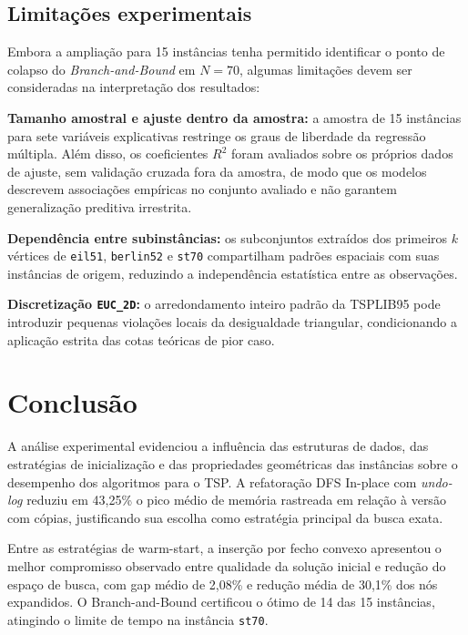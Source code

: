 \subsection{Limitações experimentais}

Embora a ampliação para 15 instâncias tenha permitido identificar o ponto de colapso do \textit{Branch-and-Bound} em $N=70$, algumas limitações devem ser consideradas na interpretação dos resultados:

\textbf{Tamanho amostral e ajuste dentro da amostra:} a amostra de 15 instâncias para sete variáveis explicativas restringe os graus de liberdade da regressão múltipla. Além disso, os coeficientes $R^2$ foram avaliados sobre os próprios dados de ajuste, sem validação cruzada fora da amostra, de modo que os modelos descrevem associações empíricas no conjunto avaliado e não garantem generalização preditiva irrestrita.

\textbf{Dependência entre subinstâncias:} os subconjuntos extraídos dos primeiros $k$ vértices de \texttt{eil51}, \texttt{berlin52} e \texttt{st70} compartilham padrões espaciais com suas instâncias de origem, reduzindo a independência estatística entre as observações.

\textbf{Discretização \texttt{EUC\_2D}:} o arredondamento inteiro padrão da TSPLIB95 pode introduzir pequenas violações locais da desigualdade triangular, condicionando a aplicação estrita das cotas teóricas de pior caso.



\section{Conclusão}

A análise experimental evidenciou a influência das estruturas de dados, das estratégias de inicialização e das propriedades geométricas das instâncias sobre o desempenho dos algoritmos para o TSP. A refatoração DFS In-place com \textit{undo-log} reduziu em 43,25\% o pico médio de memória rastreada em relação à versão com cópias, justificando sua escolha como estratégia principal da busca exata.

Entre as estratégias de warm-start, a inserção por fecho convexo apresentou o melhor compromisso observado entre qualidade da solução inicial e redução do espaço de busca, com gap médio de 2,08\% e redução média de 30,1\% dos nós expandidos. O Branch-and-Bound certificou o ótimo de 14 das 15 instâncias, atingindo o limite de tempo na instância \texttt{st70}.


